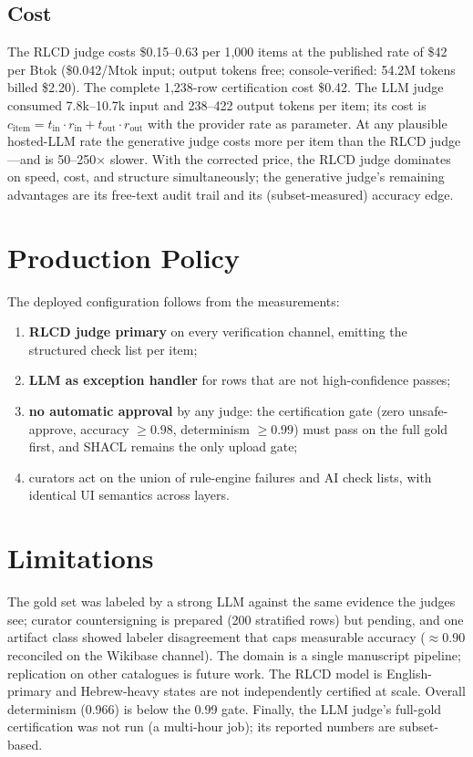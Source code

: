 \documentclass{llncs}
\begin{document}
\subsection{Cost}

The RLCD judge costs \$0.15--0.63 per 1{,}000 items at the published rate
of \$42 per Btok (\$0.042/Mtok input; output tokens free;
console-verified: 54.2M tokens billed \$2.20). The complete 1{,}238-row
certification cost \$0.42. The LLM judge consumed 7.8k--10.7k input and
238--422 output tokens per item; its cost is
$c_{\text{item}} = t_{\text{in}} \cdot r_{\text{in}} + t_{\text{out}}
\cdot r_{\text{out}}$ with the provider rate as parameter. At any
plausible hosted-LLM rate the generative judge costs more per item than
the RLCD judge---and is 50--250$\times$ slower. With the corrected price,
the RLCD judge dominates on speed, cost, and structure simultaneously;
the generative judge's remaining advantages are its free-text audit trail
and its (subset-measured) accuracy edge.

\section{Production Policy}
\label{sec:policy}

The deployed configuration follows from the measurements:
\begin{enumerate}
\item \textbf{RLCD judge primary} on every verification channel, emitting
  the structured check list per item;
\item \textbf{LLM as exception handler} for rows that are not
  high-confidence passes;
\item \textbf{no automatic approval} by any judge: the certification gate
  (zero unsafe-approve, accuracy $\geq 0.98$, determinism $\geq 0.99$)
  must pass on the full gold first, and SHACL remains the only upload
  gate;
\item curators act on the union of rule-engine failures and AI check
  lists, with identical UI semantics across layers.
\end{enumerate}

\section{Limitations}
\label{sec:limits}

The gold set was labeled by a strong LLM against the same evidence the
judges see; curator countersigning is prepared (200 stratified rows) but
pending, and one artifact class showed labeler disagreement that caps
measurable accuracy ($\approx$0.90 reconciled on the Wikibase channel).
The domain is a single manuscript pipeline; replication on other
catalogues is future work. The RLCD model is English-primary and
Hebrew-heavy states are not independently certified at scale. Overall
determinism (0.966) is below the 0.99 gate. Finally, the LLM judge's
full-gold certification was not run (a multi-hour job); its reported
numbers are subset-based.
\end{document}
